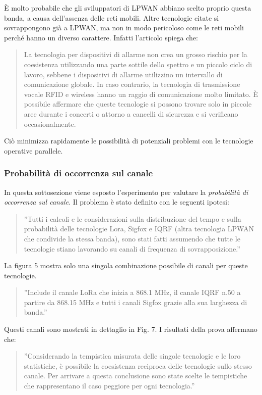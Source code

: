 \documentclass[a4paper]{report} %
\begin{document}
È molto probabile che gli sviluppatori di LPWAN abbiano scelto proprio questa banda, a causa dell'assenza delle reti mobili. Altre tecnologie citate si sovrappongono già a LPWAN, ma non in modo pericoloso come le reti mobili perché hanno un diverso carattere. Infatti l'articolo \cite{art:rif.46} spiega che:
\begin{quote}
	La tecnologia per dispositivi di allarme non crea un grosso rischio per la coesistenza utilizzando una parte sottile dello spettro e un piccolo ciclo di lavoro, sebbene i dispositivi di allarme utilizzino un intervallo di comunicazione globale. In caso contrario, la tecnologia di trasmissione vocale RFID e wireless hanno un raggio di comunicazione molto limitato. È possibile affermare che queste tecnologie si possono trovare solo in piccole aree durante i concerti o attorno a cancelli di sicurezza e si verificano occasionalmente.
\end{quote}
Ciò minimizza rapidamente le possibilità di potenziali problemi con le tecnologie operative parallele.

\subsubsection{Probabilità di occorrenza sul canale}
In questa sottosezione viene esposto l'esperimento \cite{art:rif.46} per valutare la \textit{probabilità di occorrenza sul canale}. Il problema è stato definito con le seguenti ipotesi:
\begin{quote}
	''Tutti i calcoli e le considerazioni sulla distribuzione del tempo e sulla probabilità delle tecnologie Lora, Sigfox e IQRF (altra tecnologia LPWAN che condivide la stessa banda), sono stati fatti assumendo che tutte le tecnologie stiano lavorando su canali di frequenza di sovrapposizione.''
\end{quote}
La figura 5 mostra solo una singola combinazione possibile di canali per queste tecnologie. 
\begin{quote}
	''Include il canale LoRa che inizia a 868.1 MHz, il canale IQRF n.50 a partire da 868.15 MHz e tutti i canali Sigfox grazie alla sua larghezza di banda.''
\end{quote}
Questi canali sono mostrati in dettaglio in Fig. 7. I risultati della prova affermano che:
\begin{quote}
	''Considerando la tempistica misurata delle singole tecnologie e le loro statistiche, è possibile la coesistenza reciproca delle tecnologie sullo stesso canale. Per arrivare a questa conclusione sono state scelte le tempistiche che rappresentano il caso peggiore per ogni tecnologia.''
\end{quote}
\end{document}
